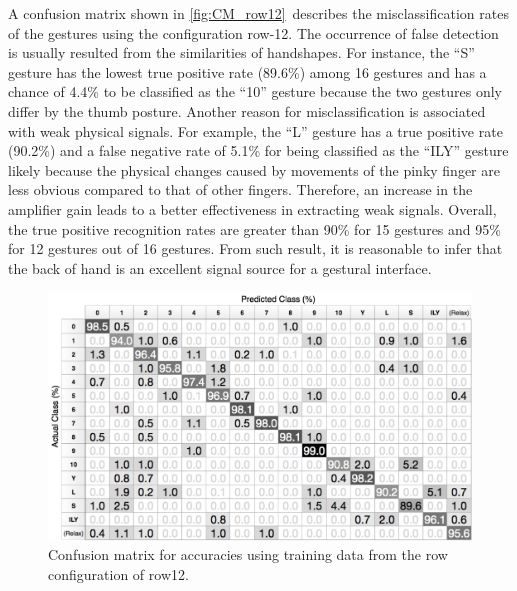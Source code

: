 \documentclass{sigchi}
\begin{document}
A confusion matrix shown in \autoref{fig:CM_row12}\ describes the misclassification rates of the gestures using the configuration row-12.
The occurrence of false detection is usually resulted from the similarities of handshapes.
For instance, the ``S'' gesture has the lowest true positive rate (89.6\%) among 16 gestures and has a chance of 4.4\% to be classified as the ``10'' gesture because the two gestures only differ by the thumb posture.
Another reason for misclassification is associated with weak physical signals.
For example, the ``L'' gesture has a true positive rate (90.2\%) and a false negative rate of 5.1\% for being classified as the ``ILY'' gesture likely because the  physical changes caused by movements of the pinky finger are less obvious compared to that of other fingers. Therefore, an increase in the amplifier gain leads to a better effectiveness in extracting weak signals.
Overall, the true positive recognition rates are greater than 90\% for 15 gestures and 95\% for 12 gestures out of 16 gestures. From such result, it is reasonable to infer that the back of hand is an excellent signal source for a gestural interface.

\begin{figure}
  \begin{center}
  \includegraphics[width=1\columnwidth]{figures/CM_row12_v2.pdf}
  \caption{Confusion matrix for accuracies using training data from the row configuration of row12.}
  \label{fig:CM_row12}
  \end{center}
\end{figure}
\end{document}
